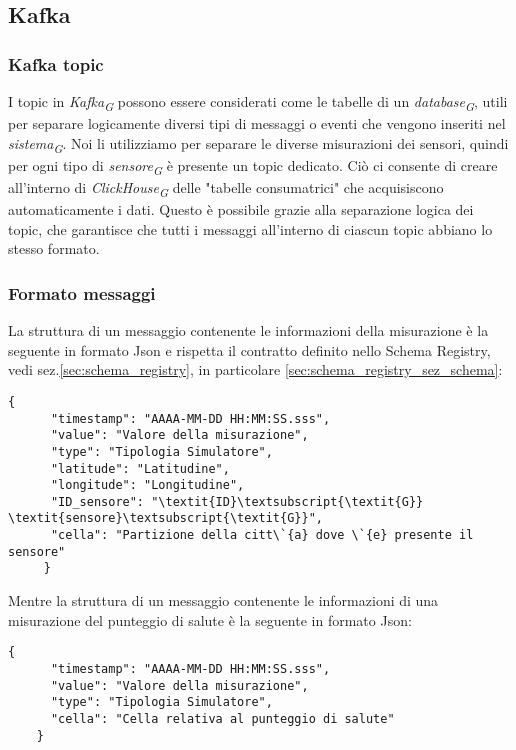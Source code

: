\subsection{Kafka}
\subsubsection{Kafka topic}
I topic in \textit{Kafka}\textsubscript{\textit{G}} possono essere considerati come le tabelle di un \textit{database}\textsubscript{\textit{G}}, utili per separare logicamente diversi tipi di messaggi o eventi che vengono inseriti nel \textit{sistema}\textsubscript{\textit{G}}. Noi li utilizziamo per separare le diverse misurazioni dei sensori, quindi per ogni tipo di \textit{sensore}\textsubscript{\textit{G}} è presente un topic dedicato. Ciò ci consente di creare all'interno di \textit{ClickHouse}\textsubscript{\textit{G}} delle "tabelle consumatrici" che acquisiscono automaticamente i dati. Questo è possibile grazie alla separazione logica dei topic, che garantisce che tutti i messaggi all'interno di ciascun topic abbiano lo stesso formato.
\subsubsection{Formato messaggi} \label{sec:formatoMessaggi}
La struttura di un messaggio contenente le informazioni della misurazione è la seguente in formato Json e rispetta il contratto definito nello Schema Registry, vedi sez.\ref{sec:schema_registry}, in particolare \ref{sec:schema_registry_sez_schema}:
\begin{lstlisting}[style=code]
    {
      "timestamp": "AAAA-MM-DD HH:MM:SS.sss", 
      "value": "Valore della misurazione",  
      "type": "Tipologia Simulatore",
      "latitude": "Latitudine",
      "longitude": "Longitudine",
      "ID_sensore": "\textit{ID}\textsubscript{\textit{G}} \textit{sensore}\textsubscript{\textit{G}}",
      "cella": "Partizione della citt\`{a} dove \`{e} presente il sensore" 
     }
\end{lstlisting}
Mentre la struttura di un messaggio contenente le informazioni di una misurazione del punteggio di salute è la seguente in formato Json:
\begin{lstlisting}[style=code]
    {
      "timestamp": "AAAA-MM-DD HH:MM:SS.sss", 
      "value": "Valore della misurazione",  
      "type": "Tipologia Simulatore",
      "cella": "Cella relativa al punteggio di salute"
    }
\end{lstlisting}


